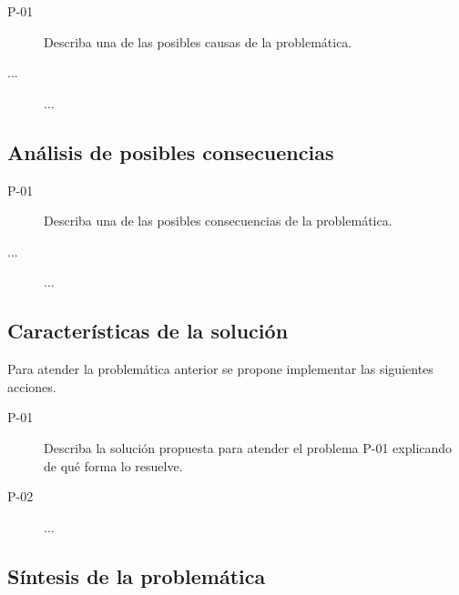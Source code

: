 \begin{description}
	\item[P-01] Describa una de las posibles causas de la problemática.
	\item[...] ...
\end{description}

\subsection{Análisis de posibles consecuencias}

\begin{description}
	\item[P-01] Describa una de las posibles consecuencias de la problemática.
	\item[...] ...
\end{description}
 
\subsection{Características de la solución}


Para atender la problemática anterior se propone implementar las siguientes acciones.

\begin{description}
	\item[P-01] Describa la solución propuesta para atender el problema P-01 explicando de qué forma lo resuelve.
	\item[P-02] ...
\end{description}

\subsection{Síntesis de la problemática}


